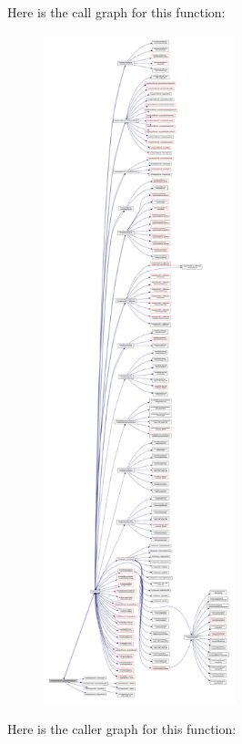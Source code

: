 Here is the call graph for this function\+:\nopagebreak
\begin{figure}[H]
\begin{center}
\leavevmode
\includegraphics[height=550pt]{namespacemodulearpstoww3_a42304b111881f48406d8d939918e21ef_cgraph}
\end{center}
\end{figure}
Here is the caller graph for this function\+:\nopagebreak
